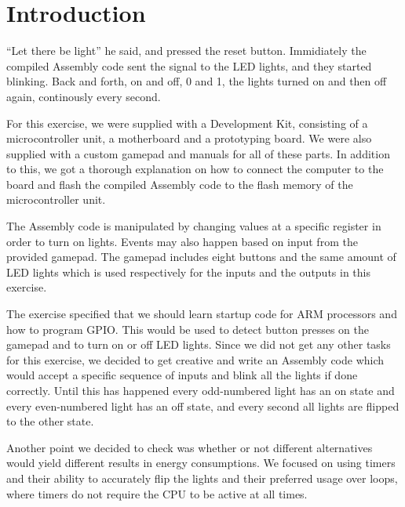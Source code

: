 \chapter{Introduction}

``Let there be light'' he said, and pressed the reset button. Immidiately the compiled Assembly code sent the signal to the LED lights, and they started blinking. Back and forth, on and off, 0 and 1, the lights turned on and then off again, continously every second.

For this exercise, we were supplied with a Development Kit, consisting of a microcontroller unit, a motherboard and a prototyping board. We were also supplied with a custom gamepad and manuals for all of these parts. In addition to this, we got a thorough explanation on how to connect the computer to the board and flash the compiled Assembly code to the flash memory of the microcontroller unit.

The Assembly code is manipulated by changing values at a specific
register in order to turn on lights. Events may also happen based on input from the provided gamepad. The
gamepad includes eight buttons and the same amount of LED lights which is used respectively
for the inputs and the outputs in this exercise.

The exercise specified that we should learn startup code for ARM processors
and how to program GPIO. This would be used to detect button presses on the
gamepad and to turn on or off LED lights. Since we did not get any other tasks
for this exercise, we decided to get creative and write an Assembly code which
would accept a specific sequence of inputs and blink all the lights if done
correctly. Until this has happened every odd-numbered light has an on state and
every even-numbered light has an off state, and every second all lights are
flipped to the other state.

Another point we decided to check was whether or not different alternatives would yield different results in energy consumptions. We focused on using timers and their ability to accurately flip the lights and their preferred usage over loops, where timers do not require the CPU to be active at all times.
